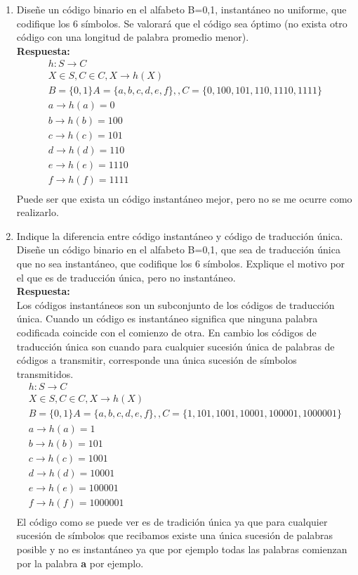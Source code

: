 \documentclass[12pt,a4paper]{article}
\begin{document}
\begin{enumerate}
\item Diseñe un código binario en el alfabeto B={0,1}, instantáneo no uniforme, que codifique los 6 símbolos. Se valorará que el código sea óptimo (no exista otro código con una longitud de palabra promedio menor).
\\
\textbf{Respuesta:}\\
		$$
\begin{array}{c}{h: S \rightarrow C} \\ {X \in S, C \in C, X \rightarrow h(X)}		\\B=\{0,1\} A=\{a,b,c,d,e,f\},,C=\{0,100,101,110,1110,1111\}\\
a\rightarrow h(a) = 0\\
b\rightarrow h(b) = 100\\
c\rightarrow h(c) = 101\\
d\rightarrow h(d) = 110\\
e\rightarrow h(e) = 1110\\
f\rightarrow h(f) = 1111\\
\end{array}
$$
Puede ser que exista un código instantáneo  mejor, pero no se me ocurre como realizarlo.  
\item  Indique la diferencia entre código instantáneo y código de traducción única. Diseñe un código binario en el alfabeto B={0,1}, que sea de traducción única que no sea instantáneo, que codifique los 6 símbolos. Explique el motivo por el que es de traducción única, pero no instantáneo.\\
\textbf{Respuesta:}\\
Los códigos instantáneos son un subconjunto de los códigos de traducción única.  Cuando un código es instantáneo significa que ninguna palabra codificada coincide con el comienzo de otra. En cambio los códigos de traducción única son cuando para cualquier sucesión única de palabras de códigos a transmitir, corresponde una única sucesión de símbolos transmitidos. 
		$$
\begin{array}{c}{h: S \rightarrow C} \\ {X \in S, C \in C, X \rightarrow h(X)}		\\B=\{0,1\} A=\{a,b,c,d,e,f\},,C=\{1,101,1001,10001,100001,1000001\}\\
a\rightarrow h(a) = 1\\
b\rightarrow h(b) = 101\\
c\rightarrow h(c) = 1001\\
d\rightarrow h(d) = 10001\\
e\rightarrow h(e) = 100001\\
f\rightarrow h(f) = 1000001\\
\end{array}
$$
El código como se puede ver es de tradición única ya que para cualquier sucesión de símbolos que recibamos existe una única sucesión de palabras posible y no es instantáneo ya que por ejemplo todas las palabras comienzan por la palabra \textbf{a} por ejemplo. 
\end{enumerate}
\end{document}
